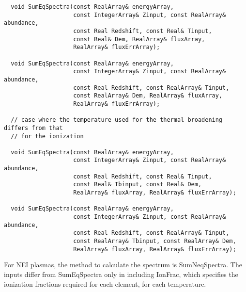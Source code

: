 \documentclass[11pt]{book}
\begin{document}
\begin{verbatim}
  void SumEqSpectra(const RealArray& energyArray, 
                    const IntegerArray& Zinput, const RealArray& abundance,
                    const Real Redshift, const Real& Tinput,
                    const Real& Dem, RealArray& fluxArray, 
                    RealArray& fluxErrArray);

  void SumEqSpectra(const RealArray& energyArray, 
                    const IntegerArray& Zinput, const RealArray& abundance,
                    const Real Redshift, const RealArray& Tinput,
                    const RealArray& Dem, RealArray& fluxArray, 
                    RealArray& fluxErrArray);

  // case where the temperature used for the thermal broadening differs from that
  // for the ionization

  void SumEqSpectra(const RealArray& energyArray, 
                    const IntegerArray& Zinput, const RealArray& abundance,
                    const Real Redshift, const Real& Tinput, 
                    const Real& Tbinput, const Real& Dem,
                    RealArray& fluxArray, RealArray& fluxErrArray);

  void SumEqSpectra(const RealArray& energyArray, 
                    const IntegerArray& Zinput, const RealArray& abundance,
                    const Real Redshift, const RealArray& Tinput, 
                    const RealArray& Tbinput, const RealArray& Dem, 
                    RealArray& fluxArray, RealArray& fluxErrArray);
\end{verbatim}

For NEI plasmas, the method to calculate the spectrum is
SumNeqSpectra. The inputs differ from SumEqSpectra only in including
IonFrac, which specifies the ionization fractions required for each
element, for each temperature.
\end{document}

